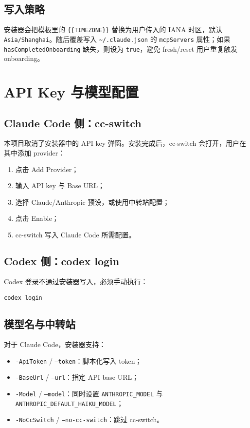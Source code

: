 \documentclass[11pt,a4paper]{ctexbook}
\begin{document}
\section{写入策略}

安装器会把模板里的 \texttt{\{\{TIMEZONE\}\}} 替换为用户传入的 IANA 时区，默认 \texttt{Asia/Shanghai}。随后覆盖写入 \texttt{\textasciitilde/.claude.json} 的 \texttt{mcpServers} 属性；如果 \texttt{hasCompletedOnboarding} 缺失，则设为 \texttt{true}，避免 fresh/reset 用户重复触发 onboarding。

\chapter{API Key 与模型配置}

\section{Claude Code 侧：cc-switch}

本项目取消了安装器中的 API key 弹窗。安装完成后，cc-switch 会打开，用户在其中添加 provider：

\begin{enumerate}[leftmargin=2em]
  \item 点击 Add Provider；
  \item 输入 API key 与 Base URL；
  \item 选择 Claude/Anthropic 预设，或使用中转站配置；
  \item 点击 Enable；
  \item cc-switch 写入 Claude Code 所需配置。
\end{enumerate}

\section{Codex 侧：codex login}

Codex 登录不通过安装器写入，必须手动执行：

\begin{lstlisting}[language={}]
codex login
\end{lstlisting}

\section{模型名与中转站}

对于 Claude Code，安装器支持：

\begin{itemize}[leftmargin=2em]
  \item \texttt{-ApiToken} / \texttt{--token}：脚本化写入 token；
  \item \texttt{-BaseUrl} / \texttt{--url}：指定 API base URL；
  \item \texttt{-Model} / \texttt{--model}：同时设置 \texttt{ANTHROPIC\_MODEL} 与 \texttt{ANTHROPIC\_DEFAULT\_HAIKU\_MODEL}；
  \item \texttt{-NoCcSwitch} / \texttt{--no-cc-switch}：跳过 cc-switch。
\end{itemize}
\end{document}
